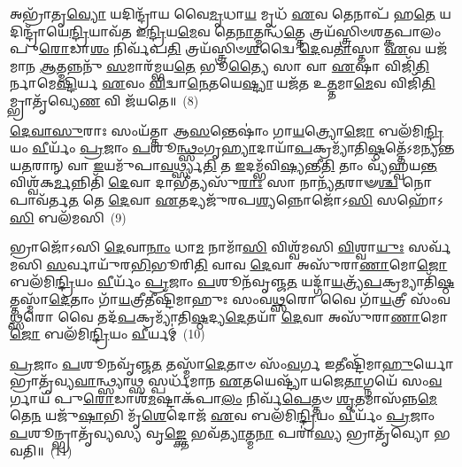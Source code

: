 𑌅𑌭𑍍𑌰𑌾᳴𑌤𑍃\-\ul{𑌵𑍍𑌯𑍋} 𑌯𑌦𑌿𑌨𑍍𑌦𑍍𑌰𑌾᳴𑌯 𑌵𑍈\-\ul{𑌮𑍃}\-𑌧𑌾\-\ul{𑌯} 𑌮𑍃𑌧᳴ \ul{𑌏}\-𑌵 𑌤𑍇𑌨𑌾𑌪᳴ 𑌹\-\ul{𑌤𑍇} 𑌯𑌦𑌿𑌨𑍍𑌦𑍍𑌰𑌾᳴𑌯𑍇\-\ul{𑌨𑍍𑌦𑍍𑌰𑌿}\-𑌯𑌾𑌵᳴𑌤 𑌇\-\ul{𑌨𑍍𑌦𑍍𑌰𑌿}\-𑌯\-\ul{𑌮𑍇}\-𑌵 𑌤𑍇\-\ul{𑌨𑌾}\-𑌤𑍍𑌮𑌨𑍍𑌧᳴\-\ul{𑌤𑍍𑌤𑍇} 𑌤𑍍𑌰𑌯᳴𑌸𑍍𑌤𑍍𑌰𑌿𑍞𑌶𑌤𑍍𑌕𑌪𑌾𑌲𑌂 𑌪𑍁\-\ul{𑌰𑍋}\-𑌡𑌾\-\ul{𑌶𑌂} 𑌨𑌿𑌰𑍍𑌵᳴𑌪\-\ul{𑌤𑌿} 𑌤𑍍𑌰𑌯᳴𑌸𑍍𑌤𑍍𑌰𑌿𑍞\-\ul{𑌶}\-𑌦𑍍𑌵𑍈 \ul{𑌦𑍇}\-𑌵\-\ul{𑌤𑌾}\-𑌸𑍍𑌤𑌾 \ul{𑌏}\-𑌵 𑌯𑌜᳴𑌮𑌾𑌨 \ul{𑌆}\-𑌤𑍍𑌮𑌨𑍍𑌨𑌨𑍁᳴ \ul{𑌸}\-𑌮𑌾𑌰᳴𑌮𑍍𑌭𑌯\-\ul{𑌤𑍇} 𑌭𑍂\-\ul{𑌤𑍍𑌯𑍈} 𑌸𑌾 𑌵𑌾 \ul{𑌏}\-𑌷𑌾 𑌵𑌿𑌜𑌿᳴\-\ul{𑌤𑌿}\-𑌰𑍍𑌨𑌾𑌮𑍇\-\ul{𑌷𑍍𑌟𑌿}\-𑌰𑍍𑌯 \ul{𑌏}\-𑌵𑌂 \ul{𑌵𑌿}\-𑌦𑍍𑌵𑌾\-\ul{𑌨𑍇}\-𑌤𑌯𑍇\-\ul{𑌷𑍍𑌟𑍍𑌯𑌾} 𑌯𑌜᳴𑌤 𑌉\-\ul{𑌤𑍍𑌤}\-𑌮𑌾\-\ul{𑌮𑍇}\-𑌵 𑌵𑌿𑌜𑌿᳴\-\ul{𑌤𑌿}\-𑌮𑍍𑌭𑍍𑌰𑌾𑌤𑍃᳴𑌵𑍍𑌯𑍇\-\ul{𑌣} 𑌵𑌿 𑌜᳴𑌯𑌤𑍇॥~(8)

{\anuvakamend[{\-\ul{𑌇}\-\-\ul{𑌨𑍍𑌦𑍍𑌰𑌿}\-𑌯𑌾𑌵᳴\-\ul{𑌤𑍀} 𑌭𑍂𑌤𑍍𑌯𑌾᳴ \ul{𑌉}\-𑌤𑍈\-\ul{𑌕𑌾}\-𑌨𑍍𑌨𑌪᳴\-\ul{𑌞𑍍𑌚𑌾}\-𑌶𑌚𑍍𑌚᳴}]}%

\-\ul{𑌦𑍇}\-\-\ul{𑌵𑌾}\-\-\ul{𑌸𑍁}\-𑌰𑌾𑌃 𑌸𑌂𑌯᳴𑌤𑍍𑌤𑌾 𑌆\-\ul{𑌸}\-𑌨𑍍𑌤𑍇𑌷𑌾𑌂॑ 𑌗𑌾\-\ul{𑌯}\-𑌤𑍍𑌰𑍍𑌯𑍋\-\ul{𑌜𑍋} 𑌬𑌲᳴𑌮𑌿\-\ul{𑌨𑍍𑌦𑍍𑌰𑌿}\-𑌯𑌂 \ul{𑌵𑍀}\-𑌰𑍍𑌯𑌂᳴ \ul{𑌪𑍍𑌰}\-𑌜𑌾𑌂 \ul{𑌪}\-𑌶𑍂\-\ul{𑌨𑍍𑌥𑍍𑌸𑌂}\-𑌗𑍃\-\ul{𑌹𑍍𑌯𑌾}\-𑌦𑌾𑌯𑌾᳴\-\ul{𑌪}\-𑌕𑍍𑌰𑌮𑍍𑌯𑌾᳴𑌤𑌿\-\ul{𑌷𑍍𑌠}\-𑌤𑍍𑌤𑍇᳴\-𑌽𑌮𑌨𑍍𑌯𑌨𑍍𑌤 𑌯\-\ul{𑌤}\-𑌰𑌾𑌨𑍍 𑌵𑌾 \ul{𑌇}\-𑌯𑌮𑍁᳴𑌪𑌾\-\ul{𑌵}\-𑌰𑍍𑌥𑍍𑌸𑍍𑌯\-\ul{𑌤𑌿} 𑌤 \ul{𑌇}\-𑌦𑌮𑍍𑌭᳴𑌵𑌿\-\ul{𑌷𑍍𑌯}\-𑌨𑍍𑌤𑍀\-\ul{𑌤𑌿} 𑌤𑌾𑌂 𑌵𑍍𑌯᳴𑌹𑍍𑌵𑌯\-\ul{𑌨𑍍𑌤} 𑌵𑌿𑌶𑍍𑌵᳴𑌕\-\ul{𑌰𑍍𑌮}\-𑌨𑍍𑌨𑌿𑌤𑌿᳴ \ul{𑌦𑍇}\-𑌵𑌾 𑌦𑌾𑌭𑍀𑌤𑍍𑌯𑌸𑍁᳴\-\ul{𑌰𑌾𑌃} 𑌸𑌾 𑌨𑌾𑌨𑍍𑌯᳴\-\ul{𑌤}\-𑌰𑌾𑍟\-\ul{𑌶𑍍𑌚} 𑌨𑍋𑌪𑌾𑌵᳴𑌰𑍍𑌤\-\ul{𑌤} 𑌤𑍇 \ul{𑌦𑍇}\-𑌵𑌾 \ul{𑌏}\-𑌤𑌦𑍍𑌯𑌜𑍁᳴𑌰𑌪\-\ul{𑌶𑍍𑌯}\-𑌨𑍍𑌨𑍋𑌜𑍋᳴\-𑌽\-\ul{𑌸𑌿} 𑌸𑌹𑍋᳴\-𑌽\-\ul{𑌸𑌿} 𑌬𑌲᳴𑌮𑌸𑌿~(9)

𑌭𑍍𑌰𑌾𑌜𑍋᳴\-𑌽𑌸𑌿 \ul{𑌦𑍇}\-𑌵𑌾\-\ul{𑌨𑌾𑌂} 𑌧𑌾\-\ul{𑌮} 𑌨𑌾𑌮𑌾᳴\-\ul{𑌸𑌿} 𑌵𑌿𑌶𑍍𑌵᳴𑌮𑌸𑌿 \ul{𑌵𑌿}\-𑌶𑍍𑌵𑌾\-\ul{𑌯𑍁𑌃} 𑌸𑌰𑍍𑌵᳴𑌮𑌸𑌿 \ul{𑌸}\-𑌰𑍍𑌵𑌾𑌯𑍁᳴𑌰\-\ul{𑌭𑌿}\-𑌭𑍂𑌰𑌿\-\ul{𑌤𑌿} 𑌵𑌾𑌵 \ul{𑌦𑍇}\-𑌵𑌾 𑌅𑌸𑍁᳴𑌰𑌾\-\ul{𑌣𑌾}\-𑌮𑍋\-\ul{𑌜𑍋} 𑌬𑌲᳴𑌮𑌿\-\ul{𑌨𑍍𑌦𑍍𑌰𑌿}\-𑌯𑌂 \ul{𑌵𑍀}\-𑌰𑍍𑌯𑌂᳴ \ul{𑌪𑍍𑌰}\-𑌜𑌾𑌂 \ul{𑌪}\-𑌶𑍂𑌨᳴𑌵𑍃𑌞𑍍𑌜\-\ul{𑌤} 𑌯𑌦𑍍𑌗𑌾᳴\-\ul{𑌯}\-𑌤𑍍𑌰𑍍𑌯᳴\-\ul{𑌪}\-𑌕𑍍𑌰𑌮𑍍𑌯𑌾𑌤𑌿᳴\-\ul{𑌷𑍍𑌠}\-𑌤𑍍𑌤𑌸𑍍𑌮𑌾᳴\-\ul{𑌦𑍇}\-𑌤𑌾𑌂 𑌗𑌾᳴\-\ul{𑌯}\-𑌤𑍍𑌰𑍀𑌤𑍀𑌷𑍍𑌟𑌿᳴𑌮𑌾𑌹𑍁𑌃 𑌸𑌂𑌵\-\ul{𑌥𑍍𑌸}\-𑌰𑍋 𑌵𑍈 𑌗𑌾᳴\-\ul{𑌯}\-𑌤𑍍𑌰𑍀 𑌸𑌂᳴𑌵\-\ul{𑌥𑍍𑌸}\-𑌰𑍋 𑌵𑍈 𑌤𑌦᳴\-\ul{𑌪}\-𑌕𑍍𑌰𑌮𑍍𑌯𑌾᳴𑌤𑌿\-\ul{𑌷𑍍𑌠}\-𑌦𑍍𑌯\-\ul{𑌦𑍇}\-𑌤𑌯𑌾᳴ \ul{𑌦𑍇}\-𑌵𑌾 𑌅𑌸𑍁᳴𑌰𑌾\-\ul{𑌣𑌾}\-𑌮𑍋\-\ul{𑌜𑍋} 𑌬𑌲᳴𑌮𑌿\-\ul{𑌨𑍍𑌦𑍍𑌰𑌿}\-𑌯𑌂 \ul{𑌵𑍀}\-𑌰𑍍𑌯𑌮𑍍॑~(10)

\-\ul{𑌪𑍍𑌰}\-𑌜𑌾𑌂 \ul{𑌪}\-𑌶𑍂𑌨𑌵𑍃᳴𑌞𑍍𑌜\-\ul{𑌤} 𑌤𑌸𑍍𑌮𑌾᳴\-\ul{𑌦𑍇}\-𑌤𑌾𑍞 𑌸𑌂᳴\-\ul{𑌵}\-𑌰𑍍𑌗 𑌇𑌤𑍀𑌷𑍍𑌟𑌿᳴𑌮𑌾\-\ul{𑌹𑍁}\-𑌰𑍍𑌯𑍋 𑌭𑍍𑌰𑌾𑌤𑍃᳴𑌵𑍍𑌯\-\ul{𑌵𑌾}\-𑌨𑍍𑌥𑍍𑌸𑍍𑌯𑌾𑌥𑍍𑌸 𑌸𑍍𑌪𑌰𑍍𑌧᳴𑌮𑌾𑌨 \ul{𑌏}\-𑌤𑌯𑍇𑌷𑍍𑌟𑍍𑌯𑌾᳴ 𑌯𑌜𑍇\-\ul{𑌤𑌾}\-𑌗𑍍𑌨𑌯𑍇᳴ 𑌸𑌂\-\ul{𑌵}\-𑌰𑍍𑌗𑌾𑌯᳴ 𑌪𑍁\-\ul{𑌰𑍋}\-𑌡𑌾𑌶᳴\-\-\ul{𑌮}\-𑌷𑍍𑌟𑌾\-𑌕᳴𑌪𑌾\-\ul{𑌲𑌂} 𑌨𑌿𑌰𑍍𑌵᳴\-\ul{𑌪𑍇}\-𑌤𑍍𑌤𑍞 \ul{𑌶𑍃}\-𑌤𑌮𑌾𑌸᳴𑌨𑍍𑌨\-\ul{𑌮𑍇}\-𑌤𑍇\-\ul{𑌨} 𑌯𑌜𑍁᳴\-\ul{𑌷𑌾}\-𑌭𑌿 𑌮𑍃᳴\-\ul{𑌶𑍇}\-𑌦𑍋𑌜᳴ \ul{𑌏}\-𑌵 𑌬𑌲᳴𑌮𑌿\-\ul{𑌨𑍍𑌦𑍍𑌰𑌿}\-𑌯𑌂 \ul{𑌵𑍀}\-𑌰𑍍𑌯𑌂᳴ \ul{𑌪𑍍𑌰}\-𑌜𑌾𑌂 \ul{𑌪}\-𑌶𑍂𑌨𑍍𑌭𑍍𑌰𑌾𑌤𑍃᳴𑌵𑍍𑌯𑌸𑍍𑌯 𑌵𑍃\-\ul{𑌙𑍍𑌕𑍍𑌤𑍇} 𑌭𑌵᳴\-\ul{𑌤𑍍𑌯𑌾}\-𑌤𑍍𑌮\-\ul{𑌨𑌾} 𑌪𑌰𑌾॑\-\ul{𑌸𑍍𑌯} 𑌭𑍍𑌰𑌾𑌤𑍃᳴𑌵𑍍𑌯𑍋 𑌭𑌵𑌤𑌿॥~(11)

